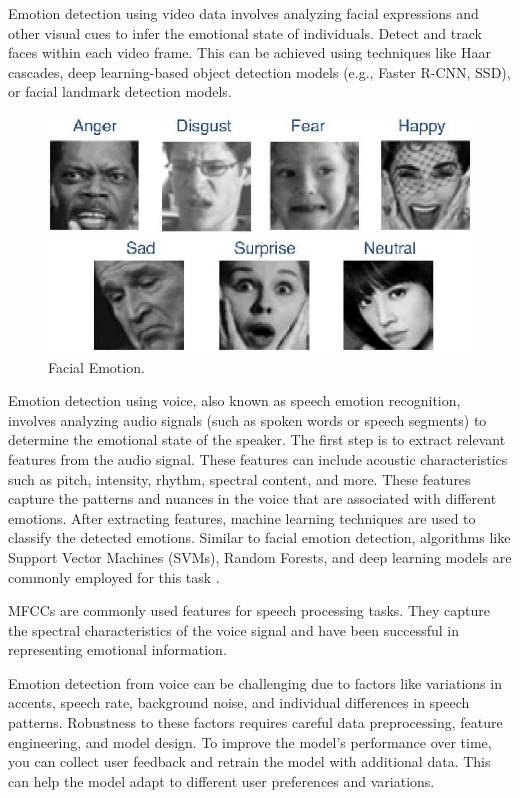 \documentclass[conference]{IEEEtran}
\begin{document}
Emotion detection using video data involves analyzing facial expressions and other visual cues to infer the emotional state of individuals. Detect and track faces within each video frame. This can be achieved using techniques like Haar cascades, deep learning-based object detection models (e.g., Faster R-CNN, SSD), or facial landmark detection models.

\begin{figure}[htbp]
\centerline{\includegraphics[scale=0.35]{Facial_Emotion.png}}
\caption{Facial Emotion.}
\label{fig}
\end{figure}

Emotion detection using voice, also known as speech emotion recognition, involves analyzing audio signals (such as spoken words or speech segments) to determine the emotional state of the speaker.  The first step is to extract relevant features from the audio signal. These features can include acoustic characteristics such as pitch, intensity, rhythm, spectral content, and more. These features capture the patterns and nuances in the voice that are associated with different emotions. After extracting features, machine learning techniques are used to classify the detected emotions. Similar to facial emotion detection, algorithms like Support Vector Machines (SVMs), Random Forests, and deep learning models are commonly employed for this task \cite{s19122730}.

MFCCs are commonly used features for speech processing tasks. They capture the spectral characteristics of the voice signal and have been successful in representing emotional information.

Emotion detection from voice can be challenging due to factors like variations in accents, speech rate, background noise, and individual differences in speech patterns. Robustness to these factors requires careful data preprocessing, feature engineering, and model design. To improve the model's performance over time, you can collect user feedback and retrain the model with additional data. This can help the model adapt to different user preferences and variations.
\end{document}
